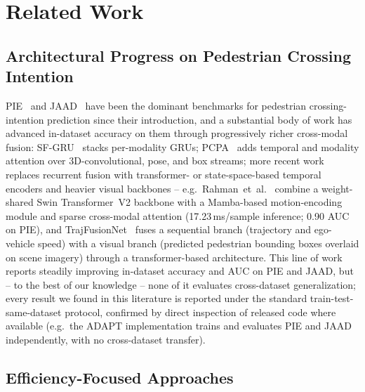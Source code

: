 \section{Related Work}
\label{sec:related}

\subsection{Architectural Progress on Pedestrian Crossing Intention}
\label{sec:related-arch}

PIE~\cite{rasouli2019pie} and JAAD~\cite{rasouli2017jaad} have been the
dominant benchmarks for pedestrian crossing-intention prediction since
their introduction, and a substantial body of work has advanced
in-dataset accuracy on them through progressively richer cross-modal
fusion: SF-GRU~\cite{rasouli2020sfgru} stacks per-modality GRUs;
PCPA~\cite{kotseruba2021pcpa} adds temporal and modality attention over
3D-convolutional, pose, and box streams; more recent work replaces
recurrent fusion with transformer- or state-space-based temporal
encoders and heavier visual backbones -- e.g.\
Rahman~et~al.~\cite{adapt2026} combine a weight-shared Swin
Transformer~V2 backbone with a Mamba-based motion-encoding module and
sparse cross-modal attention (17.23\,ms/sample inference; 0.90 AUC on
PIE), and TrajFusionNet~\cite{trajfusionnet2026} fuses a sequential
branch (trajectory and ego-vehicle speed) with a visual branch
(predicted pedestrian bounding boxes overlaid on scene imagery) through
a transformer-based architecture. This line of work reports steadily
improving in-dataset accuracy and AUC on PIE and JAAD, but -- to the
best of our knowledge -- none of it evaluates cross-dataset
generalization; every result we found in this literature is reported
under the standard train-test-same-dataset protocol, confirmed by
direct inspection of released code where available (e.g.\ the ADAPT
implementation trains and evaluates PIE and JAAD independently, with no
cross-dataset transfer).

\subsection{Efficiency-Focused Approaches}
\label{sec:related-efficiency}

